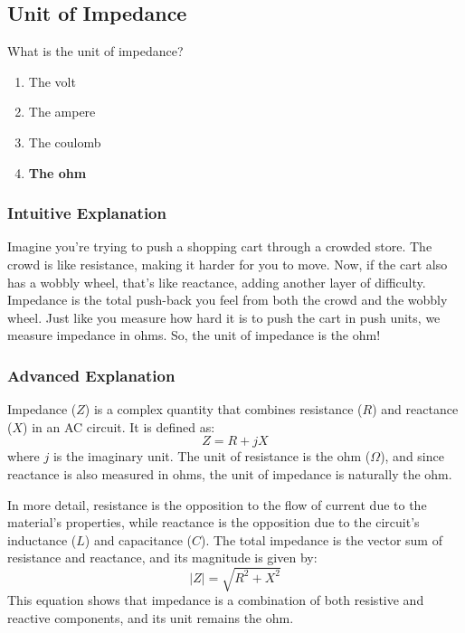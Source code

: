 \subsection{Unit of Impedance}
\label{T5C05}

\begin{tcolorbox}[colback=gray!10!white,colframe=black!75!black,title=T5C05]
What is the unit of impedance?
\begin{enumerate}[label=\Alph*]
    \item The volt
    \item The ampere
    \item The coulomb
    \item \textbf{The ohm}
\end{enumerate}
\end{tcolorbox}

\subsubsection{Intuitive Explanation}
Imagine you're trying to push a shopping cart through a crowded store. The crowd is like resistance, making it harder for you to move. Now, if the cart also has a wobbly wheel, that's like reactance, adding another layer of difficulty. Impedance is the total push-back you feel from both the crowd and the wobbly wheel. Just like you measure how hard it is to push the cart in push units, we measure impedance in ohms. So, the unit of impedance is the ohm!

\subsubsection{Advanced Explanation}
Impedance (\(Z\)) is a complex quantity that combines resistance (\(R\)) and reactance (\(X\)) in an AC circuit. It is defined as:
\[
Z = R + jX
\]
where \(j\) is the imaginary unit. The unit of resistance is the ohm (\(\Omega\)), and since reactance is also measured in ohms, the unit of impedance is naturally the ohm. 

In more detail, resistance is the opposition to the flow of current due to the material's properties, while reactance is the opposition due to the circuit's inductance (\(L\)) and capacitance (\(C\)). The total impedance is the vector sum of resistance and reactance, and its magnitude is given by:
\[
|Z| = \sqrt{R^2 + X^2}
\]
This equation shows that impedance is a combination of both resistive and reactive components, and its unit remains the ohm.

